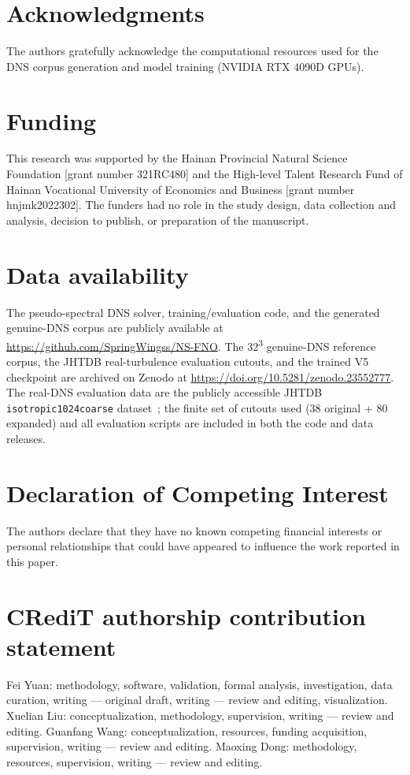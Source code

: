 \documentclass[review]{elsarticle}
\begin{document}
\section*{Acknowledgments}
The authors gratefully acknowledge the computational resources used for the DNS corpus
generation and model training (NVIDIA RTX 4090D GPUs).

\section*{Funding}
This research was supported by the Hainan Provincial Natural Science Foundation
[grant number 321RC480] and the High-level Talent Research Fund of Hainan Vocational
University of Economics and Business [grant number hnjmk2022302]. The funders had no
role in the study design, data collection and analysis, decision to publish, or
preparation of the manuscript.

\section*{Data availability}
The pseudo-spectral DNS solver, training/evaluation code, and the generated genuine-DNS
corpus are publicly available at \url{https://github.com/SpringWingss/NS-FNO}.
The 32\textsuperscript{3} genuine-DNS reference corpus, the JHTDB real-turbulence
evaluation cutouts, and the trained V5 checkpoint are archived on Zenodo at
\url{https://doi.org/10.5281/zenodo.23552777}. The real-DNS evaluation data are the
publicly accessible JHTDB \texttt{isotropic1024coarse} dataset~\cite{li2018jhtdb};
the finite set of cutouts used (38 original + 80 expanded) and all evaluation scripts
are included in both the code and data releases.

\section*{Declaration of Competing Interest}
The authors declare that they have no known competing financial interests or personal
relationships that could have appeared to influence the work reported in this paper.

\section*{CRediT authorship contribution statement}
Fei Yuan: methodology, software, validation, formal analysis, investigation, data
curation, writing --- original draft, writing --- review and editing, visualization.
Xuelian Liu: conceptualization, methodology, supervision, writing --- review and editing.
Guanfang Wang: conceptualization, resources, funding acquisition, supervision,
writing --- review and editing.
Maoxing Dong: methodology, resources, supervision, writing --- review and editing.
\end{document}
